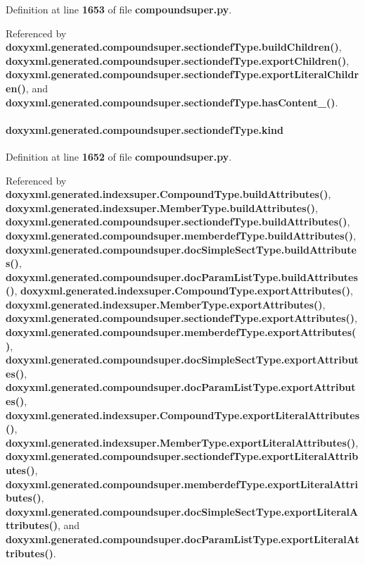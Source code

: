 Definition at line {\bf 1653} of file {\bf compoundsuper.\+py}.



Referenced by {\bf doxyxml.\+generated.\+compoundsuper.\+sectiondef\+Type.\+build\+Children()}, {\bf doxyxml.\+generated.\+compoundsuper.\+sectiondef\+Type.\+export\+Children()}, {\bf doxyxml.\+generated.\+compoundsuper.\+sectiondef\+Type.\+export\+Literal\+Children()}, and {\bf doxyxml.\+generated.\+compoundsuper.\+sectiondef\+Type.\+has\+Content\+\_\+()}.

\paragraph[{kind}]{\setlength{\rightskip}{0pt plus 5cm}doxyxml.\+generated.\+compoundsuper.\+sectiondef\+Type.\+kind}\label{classdoxyxml_1_1generated_1_1compoundsuper_1_1sectiondefType_aa9af69439ba32240f6dc27b7920ece96}


Definition at line {\bf 1652} of file {\bf compoundsuper.\+py}.



Referenced by {\bf doxyxml.\+generated.\+indexsuper.\+Compound\+Type.\+build\+Attributes()}, {\bf doxyxml.\+generated.\+indexsuper.\+Member\+Type.\+build\+Attributes()}, {\bf doxyxml.\+generated.\+compoundsuper.\+sectiondef\+Type.\+build\+Attributes()}, {\bf doxyxml.\+generated.\+compoundsuper.\+memberdef\+Type.\+build\+Attributes()}, {\bf doxyxml.\+generated.\+compoundsuper.\+doc\+Simple\+Sect\+Type.\+build\+Attributes()}, {\bf doxyxml.\+generated.\+compoundsuper.\+doc\+Param\+List\+Type.\+build\+Attributes()}, {\bf doxyxml.\+generated.\+indexsuper.\+Compound\+Type.\+export\+Attributes()}, {\bf doxyxml.\+generated.\+indexsuper.\+Member\+Type.\+export\+Attributes()}, {\bf doxyxml.\+generated.\+compoundsuper.\+sectiondef\+Type.\+export\+Attributes()}, {\bf doxyxml.\+generated.\+compoundsuper.\+memberdef\+Type.\+export\+Attributes()}, {\bf doxyxml.\+generated.\+compoundsuper.\+doc\+Simple\+Sect\+Type.\+export\+Attributes()}, {\bf doxyxml.\+generated.\+compoundsuper.\+doc\+Param\+List\+Type.\+export\+Attributes()}, {\bf doxyxml.\+generated.\+indexsuper.\+Compound\+Type.\+export\+Literal\+Attributes()}, {\bf doxyxml.\+generated.\+indexsuper.\+Member\+Type.\+export\+Literal\+Attributes()}, {\bf doxyxml.\+generated.\+compoundsuper.\+sectiondef\+Type.\+export\+Literal\+Attributes()}, {\bf doxyxml.\+generated.\+compoundsuper.\+memberdef\+Type.\+export\+Literal\+Attributes()}, {\bf doxyxml.\+generated.\+compoundsuper.\+doc\+Simple\+Sect\+Type.\+export\+Literal\+Attributes()}, and {\bf doxyxml.\+generated.\+compoundsuper.\+doc\+Param\+List\+Type.\+export\+Literal\+Attributes()}.

